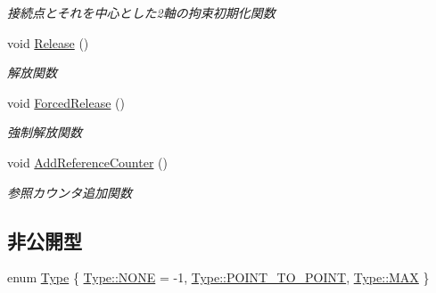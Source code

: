 \begin{DoxyCompactItemize}
\begin{DoxyCompactList}\small\item\em 接続点とそれを中心とした2軸の拘束初期化関数 \end{DoxyCompactList}\item 
void \mbox{\hyperlink{class_bullet_physics_constraint_ac29d9fed9b28cc7f97a10f888c0dc12f}{Release}} ()
\begin{DoxyCompactList}\small\item\em 解放関数 \end{DoxyCompactList}\item 
void \mbox{\hyperlink{class_bullet_physics_constraint_ad5fa02063f2b563bd01f37a2e8896554}{Forced\+Release}} ()
\begin{DoxyCompactList}\small\item\em 強制解放関数 \end{DoxyCompactList}\item 
void \mbox{\hyperlink{class_bullet_physics_constraint_a36ee598adbde9eacbada40fd5d6e4942}{Add\+Reference\+Counter}} ()
\begin{DoxyCompactList}\small\item\em 参照カウンタ追加関数 \end{DoxyCompactList}\end{DoxyCompactItemize}
\subsection*{非公開型}
\begin{DoxyCompactItemize}
\item 
enum \mbox{\hyperlink{class_bullet_physics_constraint_ad85080d0a6ff58365f4f6fa4c9381e24}{Type}} \{ \mbox{\hyperlink{class_bullet_physics_constraint_ad85080d0a6ff58365f4f6fa4c9381e24ab50339a10e1de285ac99d4c3990b8693}{Type\+::\+N\+O\+NE}} = -\/1, 
\mbox{\hyperlink{class_bullet_physics_constraint_ad85080d0a6ff58365f4f6fa4c9381e24a3593f477d0cd8e856dc7c6d621ab4eea}{Type\+::\+P\+O\+I\+N\+T\+\_\+\+T\+O\+\_\+\+P\+O\+I\+NT}}, 
\mbox{\hyperlink{class_bullet_physics_constraint_ad85080d0a6ff58365f4f6fa4c9381e24a26a4b44a837bf97b972628509912b4a5}{Type\+::\+M\+AX}}
 \}
\end{DoxyCompactItemize}
